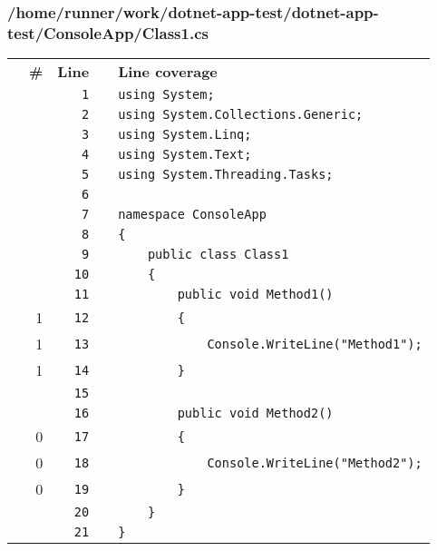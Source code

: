 \documentclass[a4paper,landscape,10pt]{article}
\begin{document}
\subsubsection{/home/runner/work/dotnet-app-test/dotnet-app-test/ConsoleApp/Class1.cs}
\begin{longtable}[l]{lrrll}
\textbf{} & \textbf{\#} & \textbf{Line} & \textbf{} & \textbf{Line coverage}\\
\cellcolor{gray} &  & \verb~1~ & & \verb~using System;~\\
\cellcolor{gray} &  & \verb~2~ & & \verb~using System.Collections.Generic;~\\
\cellcolor{gray} &  & \verb~3~ & & \verb~using System.Linq;~\\
\cellcolor{gray} &  & \verb~4~ & & \verb~using System.Text;~\\
\cellcolor{gray} &  & \verb~5~ & & \verb~using System.Threading.Tasks;~\\
\cellcolor{gray} &  & \verb~6~ & & \verb~~\\
\cellcolor{gray} &  & \verb~7~ & & \verb~namespace ConsoleApp~\\
\cellcolor{gray} &  & \verb~8~ & & \verb~{~\\
\cellcolor{gray} &  & \verb~9~ & & \verb~    public class Class1~\\
\cellcolor{gray} &  & \verb~10~ & & \verb~    {~\\
\cellcolor{gray} &  & \verb~11~ & & \verb~        public void Method1()~\\
\cellcolor{green} & 1 & \verb~12~ & & \verb~        {~\\
\cellcolor{green} & 1 & \verb~13~ & & \verb~            Console.WriteLine("Method1");~\\
\cellcolor{green} & 1 & \verb~14~ & & \verb~        }~\\
\cellcolor{gray} &  & \verb~15~ & & \verb~~\\
\cellcolor{gray} &  & \verb~16~ & & \verb~        public void Method2()~\\
\cellcolor{red} & 0 & \verb~17~ & & \verb~        {~\\
\cellcolor{red} & 0 & \verb~18~ & & \verb~            Console.WriteLine("Method2");~\\
\cellcolor{red} & 0 & \verb~19~ & & \verb~        }~\\
\cellcolor{gray} &  & \verb~20~ & & \verb~    }~\\
\cellcolor{gray} &  & \verb~21~ & & \verb~}~\\
\end{longtable}
\newpage
\end{document}
